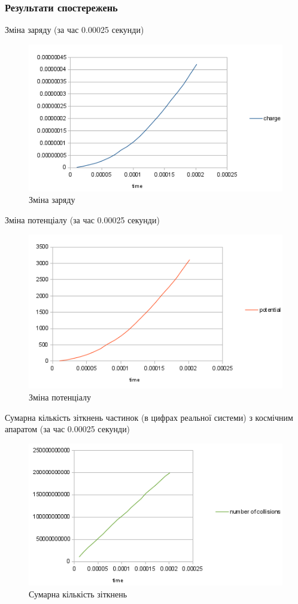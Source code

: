 \documentclass[a4paper,12pt]{article}
\begin{document}
\subsubsection{Результати спостережень}
Зміна заряду (за час 0.00025 секунди)
\begin{figure}[!htp]
\centering
\includegraphics[scale=1.00]{screens/screenshot5.png}
\caption{Зміна заряду}
\end{figure}
\newpage

Зміна потенціалу (за час 0.00025 секунди)
\begin{figure}[!htp]
\centering
\includegraphics[scale=1.00]{screens/screenshot6.png}
\caption{Зміна потенціалу}
\end{figure}

Сумарна кількість зіткнень частинок (в цифрах реальної системи) з космічним апаратом (за час 0.00025 секунди)
\begin{figure}[!htp]
\centering
\includegraphics[scale=1.00]{screens/screenshot7.png}
\caption{Сумарна кількість зіткнень}
\end{figure}
\newpage
\end{document}
